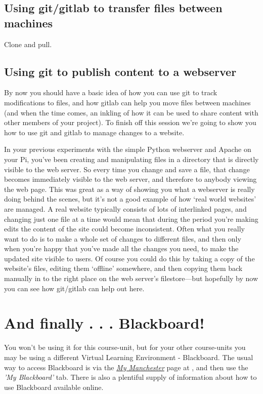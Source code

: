 \subsection{Using git/gitlab to transfer files between machines}

Clone and pull. 

\subsection{Using git to publish content to a webserver}

By now you should have a basic idea of how you can use git to track modifications to files, and how gitlab can help you move files between machines (and when the time comes, an inkling of how it can be used to share content with other members of your project). To finish off this session we're going to show you how to use git and gitlab to manage changes to a website.

In your previous experiments with the simple Python webserver and Apache on your Pi, you've been creating and manipulating files in a directory that is directly visible to the web server. So every time you change and save a file, that change becomes immediately visible to the web server, and therefore to anybody viewing the web page. This was great as a way of showing you what a webserver is really doing behind the scenes, but it's not a good example of how `real world websites' are managed. A real website typically consists of lots of interlinked pages, and changing just one file at a time would mean that during the period you're making edits the content of the site could become inconsistent. Often what you really want to do is to make a whole set of changes to different files, and then only when you're happy that you've made all the changes you need, to make the updated site visible to users. Of course you could do this by taking a copy of the website's files, editing them `offline' somewhere, and then copying them back manually in to the right place on the web server's filestore---but hopefully by now you can see how git/gitlab can help out here.



\section{And finally . . . Blackboard!}
\label{sec:blackboard}

You won't be using it for this course-unit, but for your other course-units you may be using a different Virtual Learning Environment - \textsf{Blackboard}. The usual way to access \textsf{Blackboard} is via the \href{https://my.manchester.ac.uk}{\emph{My Manchester}} page at , and then use the \emph{'My Blackboard'} tab. There is also a plentiful supply of information about how to use Blackboard available online.


